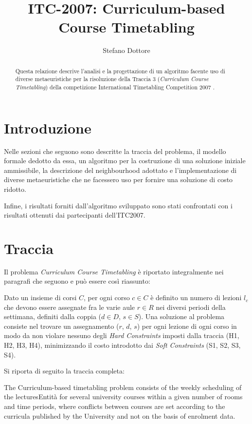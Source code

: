 \documentclass[]{article}
\title{ITC-2007: Curriculum-based Course Timetabling}
\author{Stefano Dottore}
\begin{document}
\maketitle

\begin{abstract}

Questa relazione descrive l'analisi e la progettazione di un algoritmo facente uso di diverse metaeuristiche per la risoluzione della Traccia 3 (\textit{Curriculum Course Timetabling}) della competizione International Timetabling Competition 2007 \cite{bib:itc2007}.

\end{abstract}

\section{Introduzione}

Nelle sezioni che seguono sono descritte la traccia del problema, il modello formale dedotto da essa, un algoritmo per la costruzione di una soluzione iniziale ammissibile, la descrizione del neighbourhood adottato e l'implementazione di diverse metaeuristiche che ne facessero uso per fornire una soluzione di costo ridotto.

Infine, i risultati forniti dall'algoritmo sviluppato sono stati confrontati con i risultati ottenuti dai partecipanti dell'ITC2007.

\section{Traccia}
Il problema \textit{Curriculum Course Timetabling} è riportato integralmente nei paragrafi che seguono e può essere così riassunto:

Dato un insieme di corsi $C$, per ogni corso $c \in C$ è definito un numero di lezioni $l_c$ che devono essere assegnate fra le varie aule $r \in R$ nei diversi periodi della settimana, definiti dalla coppia ($d \in D$, $s \in S$).
Una soluzione al problema consiste nel trovare un assegnamento ($r$, $d$, $s$) per ogni lezione di ogni corso in modo da non violare nessuno degli \textit{Hard Constraints} imposti dalla traccia (H1, H2, H3, H4), minimizzando il costo introdotto dai \textit{Soft Constraints} (S1, S2, S3, S4).

\vspace{10pt}
Si riporta di seguito la traccia completa:

\vspace{10pt}
\noindent
The Curriculum-based timetabling problem consists of the weekly scheduling of the lecturesEntità
for several university courses within a given number of rooms and time periods, where conflicts
between courses are set according to the curricula published by the University and not on the
basis of enrolment data.
\end{document}
